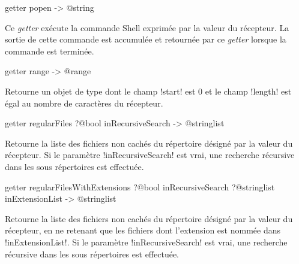 
\begin{galgasbox}
getter popen -> @string
\end{galgasbox}

Ce \emph{getter} exécute la commande Shell exprimée par la valeur du récepteur. La sortie de cette commande est accumulée et retournée par ce \emph{getter} lorsque la commande est terminée.









\begin{galgasbox}
getter range -> @range
\end{galgasbox}

Retourne un objet de type  dont le champ \ggs!start! est $0$ et le champ \ggs!length! est égal au nombre de caractères du récepteur.









\begin{galgasbox}
getter regularFiles ?@bool inRecursiveSearch -> @stringlist
\end{galgasbox}

Retourne la liste des fichiers non cachés du répertoire désigné par la valeur du récepteur. Si le paramètre \ggs!inRecursiveSearch! est vrai, une recherche récursive dans les sous répertoires est effectuée.










\begin{galgasbox}
getter regularFilesWithExtensions
    ?@bool inRecursiveSearch
    ?@stringlist inExtensionList -> @stringlist
\end{galgasbox}

Retourne la liste des fichiers non cachés du répertoire désigné par la valeur du récepteur, en ne retenant que les fichiers dont l'extension est nommée dans \ggs!inExtensionList!. Si le paramètre \ggs!inRecursiveSearch! est vrai, une recherche récursive dans les sous répertoires est effectuée.









